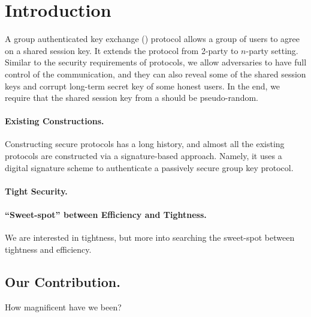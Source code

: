 \newcommand{\introGAKE}{\text{GAKE}\xspace}
\newcommand{\introAKE}{\text{AKE}\xspace}


\section{Introduction}\label{sec:introduction}
A group authenticated key exchange (\introGAKE) protocol allows a group of users to agree on a shared session key. It extends the \introAKE protocol from 2-party to $n$-party setting. Similar to the security requirements of \introAKE protocols, we allow adversaries to have full control of the communication, and they can also reveal some of the shared session keys and corrupt long-term secret key of some honest users. 
In the end, we require that the shared session key from a \introGAKE should be pseudo-random.

\paragraph{Existing Constructions.}
Constructing secure \introGAKE protocols has a long history, and almost all the existing protocols \cite{} are constructed via a signature-based approach. Namely, it uses a digital signature scheme to authenticate a passively secure group key protocol.


\paragraph{Tight Security.}

\paragraph{``Sweet-spot'' between Efficiency and Tightness.}
We are interested in tightness, but more into searching the sweet-spot between tightness and efficiency.

\subsection{Our Contribution.}
How magnificent have we been?

